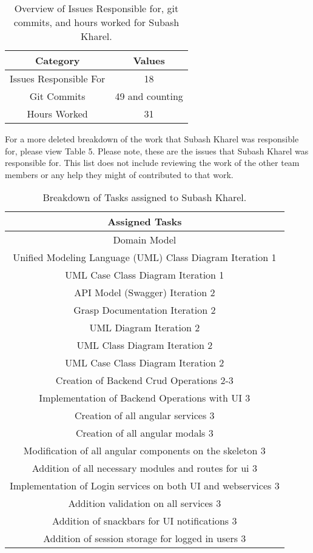 \documentclass{article}
\begin{document}
	\begin{table}[htbp!]
		\centering
		\begin{tabular}{||c c ||} 
			\hline
			Category & Values \\ [0.5ex] 
			\hline\hline
			Issues Responsible For & 18  \\ 
			Git Commits & 49 and counting \\
			Hours Worked & 31 \\
			\hline
		\end{tabular}
		\caption{Overview of Issues Responsible for, git commits, and hours worked for Subash Kharel.}
		\label{table:4}
	\end{table}
	\vspace{2cm} 
	For a more deleted breakdown of the work that Subash Kharel was responsible for, please view Table 5. Please note, these are the issues that Subash Kharel was responsible for. This list does not include reviewing the work of the other team members or any help they might of contributed to that work.
	
	\begin{table}[htbp!]
		\centering
		\begin{tabular}{||c ||} 
			\hline
			Assigned Tasks \\ [0.5ex] 
			\hline\hline
			Domain Model \\
			Unified Modeling Language (UML) Class Diagram Iteration 1 \\
			UML Case Class Diagram Iteration 1 \\
			API Model (Swagger) Iteration 2 \\
			Grasp Documentation Iteration 2 \\
			UML Diagram Iteration 2 \\
			UML Class Diagram Iteration 2 \\
			UML Case Class Diagram Iteration 2 \\
			Creation of Backend Crud Operations 2-3\\
			Implementation of Backend Operations with UI 3\\
			Creation of  all angular services 3\\
			Creation of all angular modals 3\\
			Modification of all angular components on the skeleton 3\\
			Addition of all necessary modules and routes for ui 3\\
			Implementation of Login services on both UI and webservices 3\\
			Addition validation on all services 3\\
			Addition of snackbars for UI notifications 3\\
			Addition of session storage for logged in users 3\\
			
			\hline
		\end{tabular}
		\caption{Breakdown of Tasks assigned to Subash Kharel.}
		\label{table:5}
	\end{table}
	
\end{document}
